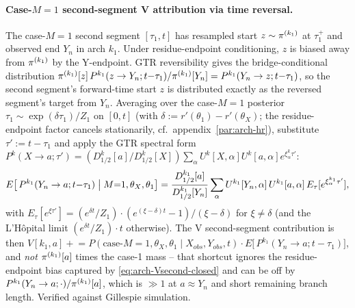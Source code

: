 \paragraph{Case-$M{=}1$ second-segment V attribution via time reversal.}
The case-$M{=}1$ second segment $[\tau_1, t]$ has resampled start
$z \sim \pi^{(k_1)}$ at $\tau_1^+$ and observed end $Y_n$ in arch $k_1$.
Under residue-endpoint conditioning, $z$ is biased away from
$\pi^{(k_1)}$ by the Y-endpoint. GTR reversibility gives the
bridge-conditional distribution
$\pi^{(k_1)}[z]\, P^{k_1}(z \to Y_n; t{-}\tau_1)/\pi^{(k_1)}[Y_n]
= P^{k_1}(Y_n \to z; t{-}\tau_1)$,
so the second segment's forward-time start $z$ is distributed exactly
as the reversed segment's target from $Y_n$. Averaging over the
case-$M{=}1$ posterior $\tau_1 \sim \exp(\delta \tau_1)/Z_1$ on $[0, t]$
(with $\delta := r'(\theta_1) - r'(\theta_X)$; the residue-endpoint
factor cancels stationarily, cf.\ appendix~\ref{par:arch-hr}),
substitute $\tau' := t - \tau_1$ and apply the GTR spectral form
$P^{k}(X \to a; \tau') = (D^k_{1/2}[a]/D^k_{1/2}[X]) \sum_\alpha
U^k[X, \alpha] U^k[a, \alpha] e^{\xi^k_\alpha \tau'}$:
\begin{equation}
  E\bigl[\, P^{k_1}(Y_n \to a; t{-}\tau_1) \bigm| M{=}1, \theta_X, \theta_1\bigr]
    = \frac{D^{k_1}_{1/2}[a]}{D^{k_1}_{1/2}[Y_n]}
      \sum_\alpha U^{k_1}[Y_n, \alpha]\, U^{k_1}[a, \alpha]\,
      E_\tau[e^{\xi^{k_1}_\alpha \tau'}],
  \label{eq:arch-Vsecond-closed}
\end{equation}
with $E_\tau[e^{\xi \tau'}] = (e^{\delta t}/Z_1) \cdot
(e^{(\xi - \delta) t} - 1)/(\xi - \delta)$ for $\xi \ne \delta$
(and the L'H\^{o}pital limit $(e^{\delta t}/Z_1) \cdot t$ otherwise).
The V second-segment contribution is then
$V[k_1, a] \mathrel{+}=
 P(\text{case-}M{=}1, \theta_X, \theta_1 \mid X_{obs}, Y_{obs}, t)
 \cdot E\bigl[\,P^{k_1}(Y_n \to a; t{-}\tau_1)\bigr]$,
and \emph{not} $\pi^{(k_1)}[a]$ times the case-1 mass -- that shortcut
ignores the residue-endpoint bias captured by
\eqref{eq:arch-Vsecond-closed} and can be off by
$P^{k_1}(Y_n \to a; \cdot)/\pi^{(k_1)}[a]$, which is
$\gg 1$ at $a \approx Y_n$ and short remaining branch length. Verified
against Gillespie simulation.

